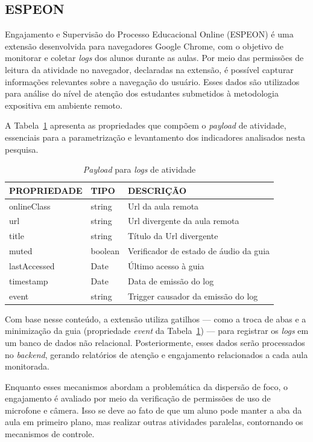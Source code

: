 \subsection{ESPEON}
Engajamento e Supervisão do Processo Educacional Online (ESPEON) é uma extensão desenvolvida para navegadores Google Chrome, com o objetivo de monitorar e coletar \textit{logs} dos alunos durante as aulas. Por meio das permissões de leitura da atividade no navegador, declaradas na extensão, é possível capturar informações relevantes sobre a navegação do usuário. Esses dados são utilizados para análise do nível de atenção dos estudantes submetidos à metodologia expositiva em ambiente remoto.

A Tabela~\ref{tab:table2} apresenta as propriedades que compõem o \textit{payload} de atividade, essenciais para a parametrização e levantamento dos indicadores analisados nesta pesquisa.

\begin{table}[ht]
\centering
\caption{\textit{Payload} para \textit{logs} de atividade}
\label{tab:table2}
\begin{tabular}{|l|l|p{8cm}|}
\hline
\textbf{PROPRIEDADE} & \textbf{TIPO} & \textbf{DESCRIÇÃO} \\
\hline
onlineClass  & string  & Url da aula remota \\
\hline
url          & string  & Url divergente da aula remota \\
\hline
title        & string  & Título da Url divergente \\
\hline
muted        & boolean & Verificador de estado de áudio da 
guia \\
\hline
lastAccessed & Date    & Último acesso à guia \\
\hline
timestamp    & Date    & Data de emissão do log \\
\hline
event        & string  & Trigger causador da emissão do log \\
\hline
\end{tabular}
\end{table}


Com base nesse conteúdo, a extensão utiliza gatilhos — como a troca de abas e a minimização da guia (propriedade \textit{event} da Tabela~\ref{tab:table2}) — para registrar os \textit{logs} em um banco de dados não relacional. Posteriormente, esses dados serão processados no \textit{backend}, gerando relatórios de atenção e engajamento relacionados a cada aula monitorada.

Enquanto esses mecanismos abordam a problemática da dispersão de foco, o engajamento é avaliado por meio da verificação de permissões de uso de microfone e câmera. Isso se deve ao fato de que um aluno pode manter a aba da aula em primeiro plano, mas realizar outras atividades paralelas, contornando os mecanismos de controle.

